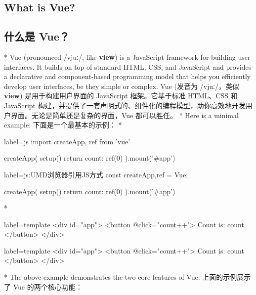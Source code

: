 \begin{paracol}{2}
\subsection{What is Vue?}
\switchcolumn
\subsection{什么是 Vue？}
\switchcolumn[0]*%
Vue (pronounced {\fontGentiumPlus /vjuː/}, like \textbf{view}) is a JavaScript framework
for building user interfaces. It builds on top of standard HTML, CSS,
and JavaScript and provides a declarative and component-based
programming model that helps you efficiently develop user interfaces, be
they simple or complex.
\switchcolumn
Vue (发音为 {\fontGentiumPlus /vjuː/}，类似 \textbf{view}) 是用于构建用户界面的
JavaScript 框架。它基于标准 HTML、CSS 和 JavaScript
构建，并提供了一套声明式的、组件化的编程模型，助你高效地开发用户界面。无论是简单还是复杂的界面，Vue
都可以胜任。
\switchcolumn[0]*%
Here is a minimal example:
\switchcolumn
下面是一个最基本的示例：
\switchcolumn[0]*%
\begin{codeJs*}{label={js}}
import { createApp, ref } from 'vue'

createApp({
  setup() {
    return {
      count: ref(0)
    }
  }
}).mount('#app')
\end{codeJs*}
\switchcolumn
\begin{codeJs*}{label={js:UMD浏览器引用JS方式}}
const {createApp,ref} = Vue;

createApp({
    setup() {
    return {
        count: ref(0)
    }
    }
}).mount('#app')
\end{codeJs*}
\switchcolumn[0]*%
\begin{codeHtml*}{label={template}}
<div id="app">
    <button @click="count++">
        Count is: {{ count }}
    </button>
</div>
\end{codeHtml*}
\switchcolumn
\begin{codeHtml*}{label={template}}
<div id="app">
    <button @click="count++">
        Count is: {{ count }}
    </button>
</div>
\end{codeHtml*}
\switchcolumn[0]*%
The above example demonstrates the two core features of Vue:
\switchcolumn
上面的示例展示了 Vue 的两个核心功能：
\end{paracol}

